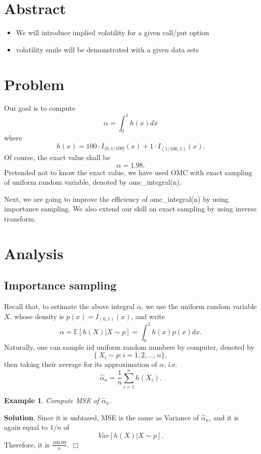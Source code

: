 \documentclass{article}
\newtheorem{example}{Example}
\begin{document}
\section{Abstract}

\begin{itemize}
 \item We will introduce implied volatility for a given call/put option
 \item volatility smile will be demonstrated with a given data sets
\end{itemize}

\section{Problem}
Our goal is to compute
$$\alpha = \int_0^1 h(x) dx$$
where
$$h(x) = 100 \cdot I_{(0, 1/100]}(x) + 1\cdot I_{(1/100, 1)} (x).$$
Of course, the exact value shall be 
$$\alpha = 1.98.$$
Pretended not to know the exact value, we have used OMC with exact sampling of uniform random variable, denoted by omc\_integral(n). 

Next, we are going to improve the efficiency of omc\_integral(n) by using importance sampling. We also extend our skill on exact sampling by using inverse transform.

\section{Analysis}

\subsection{Importance sampling}
Recall that, to estimate the above integral $\alpha$, 
we use the uniform random variable $X$, 
whose density is $p(x) = I_{(0,1)}(x)$, and write
$$\alpha = \mathbb E[h(X) | X \sim p] = \int_{0}^{1} h(x) p(x) dx.$$
Naturally, one can sample iid uniform random numbers by computer, denoted by
$$\{\ X_i \sim p: i = 1, 2, \ldots, n\} ,$$
then taking their average for its approximation of $\alpha$, i.e.
$$\hat \alpha_n = \frac 1 n \sum_{i=1}^n h(X_i).$$

\begin{example}
 Compute MSE of $\hat \alpha_{n}$.
\end{example}
{\bf Solution}.
Since it is unbiased, MSE is the same as Variance of $\hat \alpha_{n}$, 
and it is again equal to $1/n$ of 
$$Var[h(X) | X\sim p].
$$Therefore, it is
$\frac{100.99}{n}$. \hfill $\Box$
\end{document}
